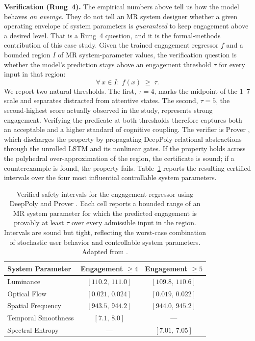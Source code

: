 \documentclass[graybox]{svmult}
\begin{document}
\textbf{Verification (Rung~4).}
The empirical numbers above tell us how the model behaves \emph{on average}. They do not tell an MR system designer whether a given operating envelope of system parameters is \emph{guaranteed} to keep engagement above a desired level. That is a Rung~4 question, and it is the formal-methods contribution of this case study. Given the trained engagement regressor $f$ and a bounded region $I$ of MR system-parameter values, the verification question is whether the model's prediction stays above an engagement threshold $\tau$ for every input in that region:
\begin{equation}
\forall\, x \in I:\; f(x) \;\geq\; \tau.
\end{equation}
We report two natural thresholds. The first, $\tau = 4$, marks the midpoint of the 1--7 scale and separates distracted from attentive states. The second, $\tau = 5$, the second-highest score actually observed in the study, represents strong engagement. Verifying the predicate at both thresholds therefore captures both an acceptable and a higher standard of cognitive coupling. The verifier is Prover \citep{ryou2021prover}, which discharges the property by propagating DeepPoly relational abstractions \citep{singh2019deeppoly} through the unrolled LSTM and its nonlinear gates. If the property holds across the polyhedral over-approximation of the region, the certificate is sound; if a counterexample is found, the property fails. Table~\ref{tab:engagement-verification} reports the resulting certified intervals over the four most influential controllable system parameters.

\begin{table}[t]
\centering
\caption{Verified safety intervals for the engagement regressor using DeepPoly \citep{singh2019deeppoly} and Prover \citep{ryou2021prover}. Each cell reports a bounded range of an MR system parameter for which the predicted engagement is provably at least $\tau$ over every admissible input in the region. Intervals are sound but tight, reflecting the worst-case combination of stochastic user behavior and controllable system parameters. Adapted from \citet{engagement2026mr}.}
\label{tab:engagement-verification}
\footnotesize
\setlength{\tabcolsep}{8pt}
\begin{tabular}{lcc}
\hline
\textbf{System Parameter} & \textbf{Engagement $\geq 4$} & \textbf{Engagement $\geq 5$}\\
\hline
Luminance           & $[110.2,\,111.0]$ & $[109.8,\,110.6]$\\
Optical Flow        & $[0.021,\,0.024]$ & $[0.019,\,0.022]$\\
Spatial Frequency   & $[943.5,\,944.2]$ & $[944.0,\,945.2]$\\
Temporal Smoothness & $[7.1,\,8.0]$     & ---\\
Spectral Entropy    & ---               & $[7.01,\,7.05]$\\
\hline
\end{tabular}
\end{table}
\end{document}
